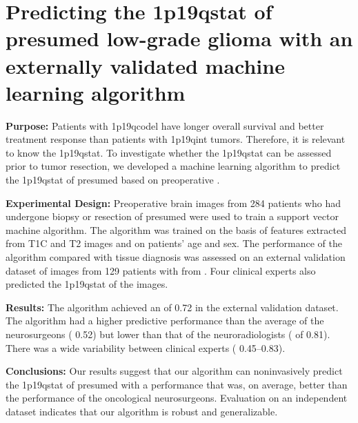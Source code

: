 
\chapter[Predicting the \acl{1p19qstat} of presumed low-grade glioma with an externally validated machine learning algorithm][Automated prediction of 1p/19q status of LGG]{Predicting the \acl{1p19qstat} of presumed low-grade glioma with an externally validated machine learning algorithm}\label{chap:LGG1p19q}


\begin{ChapterAbstract}
    \textbf{Purpose:} Patients with \acl{1p19qcodel}  have longer overall survival and better treatment response than patients with \acl{1p19qint} \glspl{tumor}.
    Therefore, it is relevant to know the \acl{1p19qstat}.
    To investigate whether the \acl{1p19qstat} can be assessed prior to \gls{tumor} resection, we developed a machine learning algorithm to predict the \acl{1p19qstat} of presumed  based on preoperative .

    \textbf{Experimental Design:} Preoperative brain  images from 284 patients who had undergone biopsy or resection of presumed  were used to train a support vector machine algorithm.
    The algorithm was trained on the basis of features extracted from \acrlong{T1C} and \acrlong{T2}  images and on patients' age and sex.
    The performance of the algorithm compared with tissue diagnosis was assessed on an external validation dataset of  images from 129 patients with  from .
    Four clinical experts also predicted the \acl{1p19qstat} of the   images.

    \textbf{Results:} The algorithm achieved an  of \num{0.72} in the external validation dataset.
    The algorithm had a higher predictive performance than the average of the neurosurgeons ( \num{0.52}) but lower than that of the neuroradiologists ( of \num{0.81}).
    There was a wide variability between clinical experts ( \numrange{0.45}{0.83}).

    \textbf{Conclusions:} Our results suggest that our algorithm can noninvasively predict the \acl{1p19qstat} of presumed  with a performance that was, on average, better than the performance of the oncological neurosurgeons.
    Evaluation on an independent dataset indicates that our algorithm is robust and generalizable.

\end{ChapterAbstract}

